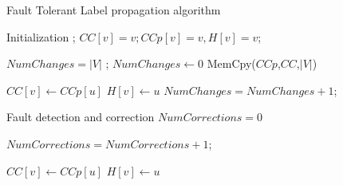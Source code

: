\begin{algorithm}[!t]
\small
\caption{Fault Tolerant Label propagation algorithm}
\label{alg:FTSV_ALG}
\begin{algorithmic}[1]

\State Initialization ;
	\State	$CC[v]=v; CCp[v]=v, H[v]=v$;
\EndFor

\State $NumChanges=|V|$
;
	\State $NumChanges\leftarrow 0$
	\State MemCpy($CCp$,$CC$,$|V|$)

			\State $CC[v]\leftarrow CCp[u]$
			\State $H[v]\leftarrow u$
			\State $NumChanges = NumChanges+1$;
			\EndIf

		\EndFor
	\EndFor

	\State Fault detection and correction
	\State $NumCorrections=0$


		\State $NumCorrections = NumCorrections+1$;

			\State $CC[v]\leftarrow CCp[u]$
			\State $H[v]\leftarrow u$
			\EndIf

		\EndFor

		\EndIf


	\EndFor


\EndWhile 


\end{algorithmic}
\end{algorithm}
%